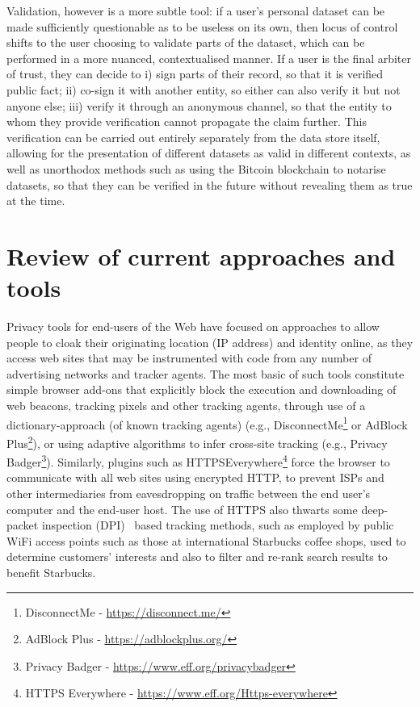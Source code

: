 \documentclass{IOS-Book-Article}     %
\begin{document}
Validation, however is a more subtle tool:
if a user's personal dataset can be made sufficiently questionable as to be useless on its own,
then locus of control shifts to the user choosing to validate parts of the dataset,
which can be performed in a more nuanced,
contextualised manner. If a user is the final arbiter of trust, they can decide
to i) sign parts of their record, so that it is verified public fact; ii)
co-sign it with another entity, so either can  also verify it but not anyone 
else;
iii) verify it through an anonymous channel, so that the entity to whom they
provide verification cannot propagate the claim further. This verification can
be carried out entirely separately from the data store itself, allowing for the
presentation of different datasets as valid  in different contexts, as well as
unorthodox methods such as using the Bitcoin blockchain to notarise datasets, so
that they can be verified in the future without revealing them as true at the
time.

\section{Review of current approaches and tools} 

Privacy tools for end-users of the Web have focused on approaches to allow people to cloak their originating location (IP address) and identity online, as they access web sites that may be instrumented with code from any number of advertising networks and tracker agents.  The most basic of such tools constitute simple browser add-ons that explicitly block the execution and downloading of web beacons, tracking pixels and other tracking agents, through use of a dictionary-approach (of known tracking agents) (e.g., DisconnectMe\footnote{DisconnectMe - \url{https://disconnect.me/}} or AdBlock Plus\footnote{AdBlock Plus - \url{https://adblockplus.org/}}), or using adaptive algorithms to infer cross-site tracking (e.g., Privacy Badger\footnote{Privacy Badger - \url{https://www.eff.org/privacybadger}}).  Similarly, plugins such as HTTPSEverywhere\footnote{HTTPS Everywhere - \url{https://www.eff.org/Https-everywhere}} force the browser to communicate with all web sites using encrypted HTTP, to prevent ISPs and other intermediaries from eavesdropping on traffic between the end user's computer and the end-user host.  The use of HTTPS also thwarts some deep-packet inspection (DPI)~\cite{kumar2006advanced} based tracking methods, such as employed by public WiFi access points such as those at international Starbucks coffee shops, used to determine customers' interests and also to filter and re-rank search results to benefit Starbucks.
\end{document}
